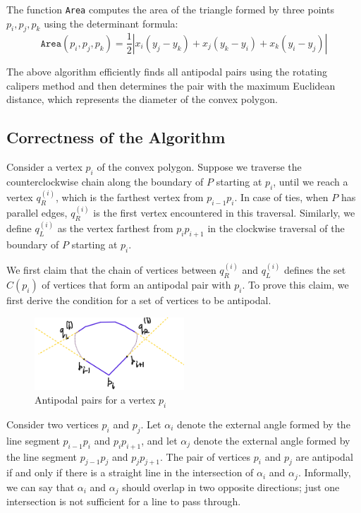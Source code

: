 \documentclass[12pt]{article}
\begin{document}
The function \texttt{Area} computes the area of the triangle formed by three points \( p_i, p_j, p_k \) using the determinant formula:
\begin{equation}
    \texttt{Area}(p_i, p_j, p_k) = \frac{1}{2} \left| x_i(y_j - y_k) + x_j(y_k - y_i) + x_k(y_i - y_j) \right|
\end{equation}

The above algorithm efficiently finds all antipodal pairs using the rotating calipers method and then determines the pair with the maximum Euclidean distance, which represents the diameter of the convex polygon.

\subsection*{Correctness of the Algorithm}

Consider a vertex \( p_i \) of the convex polygon. Suppose we traverse the counterclockwise chain along the boundary of \( P \) starting at \( p_i \), until we reach a vertex \( q_R^{(i)} \), which is the farthest vertex from \( p_{i-1}p_i \). In case of ties, when \( P \) has parallel edges, \( q_R^{(i)} \) is the first vertex encountered in this traversal. Similarly, we define \( q_L^{(i)} \) as the vertex farthest from \( p_ip_{i+1} \) in the clockwise traversal of the boundary of \( P \) starting at \( p_i \).

We first claim that the chain of vertices between \( q_R^{(i)} \) and \( q_L^{(i)} \) defines the set \( C(p_i) \) of vertices that form an antipodal pair with \( p_i \). To prove this claim, we first derive the condition for a set of vertices to be antipodal.

\begin{figure}[H]
    \centering
    \includegraphics[width=0.5\textwidth]{img/1.jpg}
    \caption{Antipodal pairs for a vertex \( p_i \)}
    \label{fig:1}
\end{figure}

Consider two vertices \( p_i \) and \( p_j \). Let \( \alpha_i \) denote the external angle formed by the line segment \( p_{i-1} p_i \) and \( p_i p_{i+1} \), and let \( \alpha_j \) denote the external angle formed by the line segment \( p_{j-1} p_j \) and \( p_j p_{j+1} \). The pair of vertices \( p_i \) and \( p_j \) are antipodal if and only if there is a straight line in the intersection of \( \alpha_i \) and \( \alpha_j \). Informally, we can say that \( \alpha_i \) and \( \alpha_j \) should overlap in two opposite directions; just one intersection is not sufficient for a line to pass through.
\end{document}
